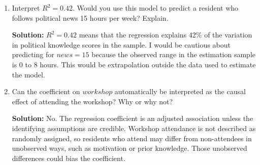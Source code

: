 \documentclass[11pt]{exam}
\begin{document}
\begin{questions}
\begin{enumerate}[leftmargin = 0.5cm, label = (\alph*), rightmargin = 0.2cm]
    \begin{solutionorbox}[4.8cm]
    \textbf{Solution:} The residual is
    \[
    \widehat u=Y-\widehat Y=61-55=6.
    \]
    The resident scored 6 points higher than the model predicted.
    \end{solutionorbox}

    \item Interpret $R^2=0.42$. Would you use this model to predict a resident who follows political news 15 hours per week? Explain.

    \begin{solutionorbox}[6.2cm]
    \textbf{Solution:} $R^2=0.42$ means that the regression explains 42\% of the variation in political knowledge scores in the sample. I would be cautious about predicting for $news=15$ because the observed range in the estimation sample is 0 to 8 hours. This would be extrapolation outside the data used to estimate the model.
    \end{solutionorbox}

    \item Can the coefficient on $workshop$ automatically be interpreted as the causal effect of attending the workshop? Why or why not?

    \begin{solutionorbox}[5.8cm]
    \textbf{Solution:} No. The regression coefficient is an adjusted association unless the identifying assumptions are credible. Workshop attendance is not described as randomly assigned, so residents who attend may differ from non-attendees in unobserved ways, such as motivation or prior knowledge. Those unobserved differences could bias the coefficient.
    \end{solutionorbox}
\end{enumerate}

\end{questions}
\end{document}
